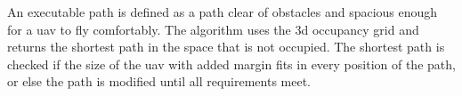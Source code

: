An executable path is defined as a path clear of obstacles and spacious enough for a \acs{uav} to fly comfortably. The algorithm uses the \acs{3d} occupancy grid and returns the shortest path in the space that is not occupied. The shortest path is checked if the size of the \acs{uav} with added margin fits in every position of the path, or else the path is modified until all requirements meet.